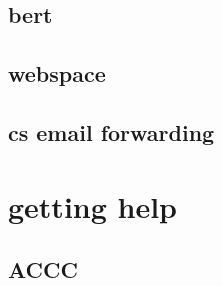 \documentclass[hyperref={pdfpagelabels=false}]{beamer}
\begin{document}
\subsection{bert}
\subsection{webspace}
\subsection{cs email forwarding}
\section{getting help}
\subsection{ACCC}
\subsection{}
\end{document}

